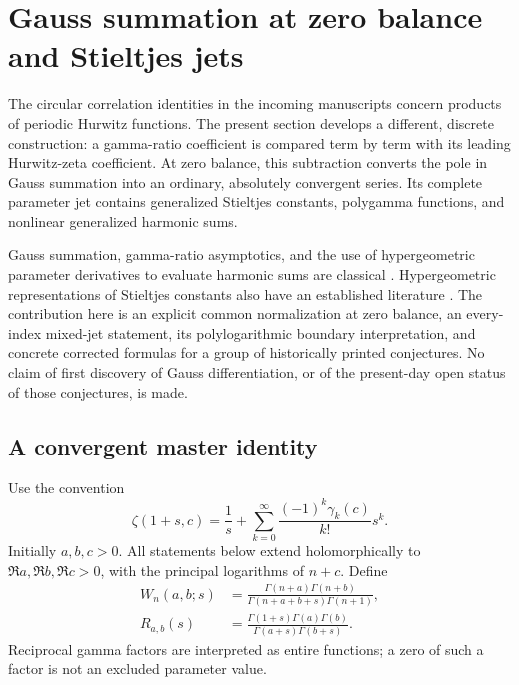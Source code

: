 
\section{Gauss summation at zero balance and Stieltjes jets}
\label{gs:section}

The circular correlation identities in the incoming manuscripts concern
products of periodic Hurwitz functions.  The present section develops a
different, discrete construction: a gamma-ratio coefficient is compared
term by term with its leading Hurwitz-zeta coefficient.  At zero balance,
this subtraction converts the pole in Gauss summation into an ordinary,
absolutely convergent series.  Its complete parameter jet contains
generalized Stieltjes constants, polygamma functions, and nonlinear
generalized harmonic sums.

Gauss summation, gamma-ratio asymptotics, and the use of hypergeometric
parameter derivatives to evaluate harmonic sums are classical
\cite{gs:DLMF,gs:ChenChu,gs:Choi}.  Hypergeometric representations of
Stieltjes constants also have an established literature
\cite{gs:Coffey}.  The contribution here is an explicit common
normalization at zero balance, an every-index mixed-jet statement, its
polylogarithmic boundary interpretation, and concrete corrected formulas
for a group of historically printed conjectures.  No claim of first
discovery of Gauss differentiation, or of the present-day open status of
those conjectures, is made.

\subsection{A convergent master identity}

Use the convention
\begin{equation}\label{gs:stieltjes-convention}
 \zeta(1+s,c)=\frac1s+
 \sum_{k=0}^{\infty}\frac{(-1)^k\gamma_k(c)}{k!}s^k.
\end{equation}
Initially $a,b,c>0$.  All statements below extend holomorphically to
$\Re a,\Re b,\Re c>0$, with the principal logarithms of $n+c$.
Define
\begin{align}
 W_n(a,b;s)&=
 \frac{\Gamma(n+a)\Gamma(n+b)}
 {\Gamma(n+a+b+s)\Gamma(n+1)},\label{gs:weight}\\
 R_{a,b}(s)&=
 \frac{\Gamma(1+s)\Gamma(a)\Gamma(b)}
 {\Gamma(a+s)\Gamma(b+s)}.\label{gs:R}
\end{align}
Reciprocal gamma factors are interpreted as entire functions; a zero
of such a factor is not an excluded parameter value.

